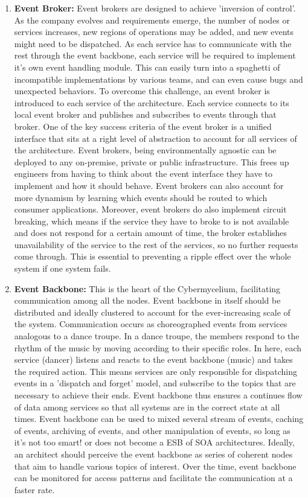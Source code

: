 \documentclass[review]{elsarticle}
\begin{document}
\begin{enumerate}
    \item \textbf{Event Broker:} Event brokers are designed to achieve 'inversion of control'. As the company evolves and requirements emerge, the number of nodes or services increases, new regions of operations may be added, and new events might need to be dispatched. As each service has to communicate with the rest through the event backbone, each service will be required to implement it's own event handling module. This can easily turn into a spaghetti of incompatible implementations by various teams, and can even cause bugs and unexpected behaviors. To overcome this challenge, an event broker is introduced to each service of the architecture. Each service connects to its local event broker and publishes and subscribes to events through that broker. One of the key success criteria of the event broker is a unified interface that sits at a right level of abstraction to account for all services of the architecture. Event brokers, being environmentally agnostic can be deployed to any on-premise, private or public infrastructure. This frees up engineers from having to think about the event interface they have to implement and how it should behave. Event brokers can also account for more dynamism by learning which events should be routed to which consumer applications.  Moreover, event brokers do also implement circuit breaking, which means if the service they have to broke to is not available and does not respond for a certain amount of time, the broker establishes unavailability of the service to the rest of the services, so no further requests come through. This is essential to preventing a ripple effect over the whole system if one system fails.
    \item \textbf{Event Backbone:} This is the heart of the Cybermycelium, facilitating communication among all the nodes. Event backbone in itself should be distributed and ideally clustered to account for the ever-increasing scale of the system. Communication occurs as choreographed events from services analogous to a dance troupe. In a dance troupe, the members respond to the rhythm of the music by moving according to their specific roles. In here, each service (dancer) listens and reacts to the event backbone (music) and takes the required action. This means services are only responsible for dispatching events in a 'dispatch and forget' model, and subscribe to the topics that are necessary to achieve their ends. Event backbone thus ensures a continues flow of data among services so that all systems are in the correct state at all times. Event backbone can be used to mixed several stream of events, caching of events, archiving of events, and other manipulation of events, so long as it's not too smart! or does not become a ESB of SOA architectures. Ideally, an architect should perceive the event backbone as series of coherent nodes that aim to handle various topics of interest. Over the time, event backbone can be monitored for access patterns and facilitate the communication at a faster rate.

\end{enumerate}
\end{document}
